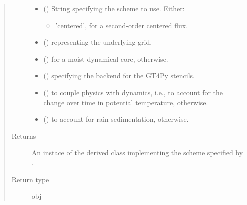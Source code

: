 \documentclass[letterpaper,10pt,english]{sphinxmanual}
\begin{document}
\begin{fulllineitems}
\begin{fulllineitems}
\begin{quote}
\begin{description}
\begin{itemize}
\begin{itemize}
\end{itemize}


\item {} 
 () \textendash{} 
String specifying the scheme to use. Either:
\begin{itemize}
\item {} 
’centered’, for a second-order centered flux.

\end{itemize}


\item {} 
 () \textendash{} {\hyperref[\detokenize{api:grids.grid_xyz.GridXYZ}]{}} representing the underlying grid.

\item {} 
 () \textendash{}  for a moist dynamical core,  otherwise.

\item {} 
 () \textendash{}  specifying the backend for the GT4Py stencils.

\item {} 
 () \textendash{}  to couple physics with dynamics, i.e., to account for the change over time in potential temperature,
 otherwise.

\item {} 
 () \textendash{}  to account for rain sedimentation,  otherwise.

\end{itemize}

\item[{Returns}] \leavevmode
An instace of the derived class implementing the scheme specified by .

\item[{Return type}] \leavevmode
obj

\end{description}\end{quote}

\end{fulllineitems}


\end{fulllineitems}
\end{document}
